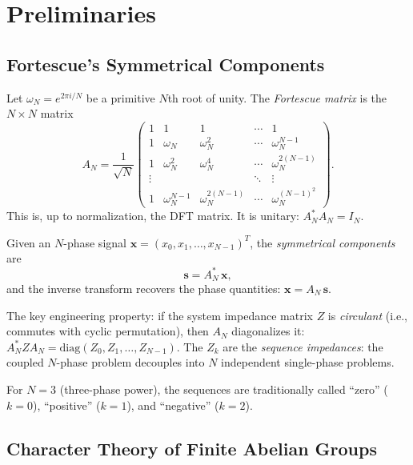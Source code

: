 \documentclass[11pt]{article}
\begin{document}
\section{Preliminaries}
\label{sec:prelim}

\subsection{Fortescue's Symmetrical Components}

Let $\omega_N = e^{2\pi i/N}$ be a primitive $N$th root of unity. The
\emph{Fortescue matrix} is the $N \times N$ matrix
\begin{equation}\label{eq:fortescue-matrix}
  A_N = \frac{1}{\sqrt{N}} \begin{pmatrix}
    1 & 1 & 1 & \cdots & 1 \\
    1 & \omega_N & \omega_N^2 & \cdots & \omega_N^{N-1} \\
    1 & \omega_N^2 & \omega_N^4 & \cdots & \omega_N^{2(N-1)} \\
    \vdots & & & \ddots & \vdots \\
    1 & \omega_N^{N-1} & \omega_N^{2(N-1)} & \cdots & \omega_N^{(N-1)^2}
  \end{pmatrix}.
\end{equation}
This is, up to normalization, the DFT matrix. It is unitary:
$A_N^* A_N = I_N$.

Given an $N$-phase signal $\mathbf{x} = (x_0, x_1, \ldots, x_{N-1})^T$,
the \emph{symmetrical components} are
\begin{equation}\label{eq:symm-comp}
  \mathbf{s} = A_N^* \, \mathbf{x},
\end{equation}
and the inverse transform recovers the phase quantities:
$\mathbf{x} = A_N \, \mathbf{s}$.

The key engineering property: if the system impedance matrix $Z$ is
\emph{circulant} (i.e., commutes with cyclic permutation), then $A_N$
diagonalizes it:
$A_N^* Z A_N = \mathrm{diag}(Z_0, Z_1, \ldots, Z_{N-1})$.
The $Z_k$ are the \emph{sequence impedances}: the coupled $N$-phase
problem decouples into $N$ independent single-phase problems.

For $N = 3$ (three-phase power), the sequences are traditionally called
``zero'' ($k = 0$), ``positive'' ($k = 1$), and ``negative'' ($k = 2$).

\subsection{Character Theory of Finite Abelian Groups}
\end{document}
